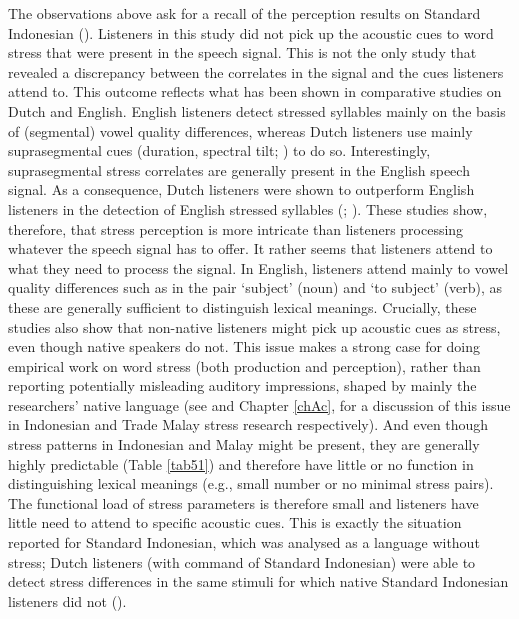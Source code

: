 The observations above ask for a recall of the perception results on Standard Indonesian (\citealt{vanzanten_word_1998}). Listeners in this study did not pick up the acoustic cues to word stress that were present in the speech signal. This is not the only study that revealed a discrepancy between the correlates in the signal and the cues listeners attend to. This outcome reflects what has been shown in comparative studies on Dutch and English. English listeners detect stressed syllables mainly on the basis of (segmental) vowel quality differences, whereas Dutch listeners use mainly suprasegmental cues (duration, spectral tilt; \citealt{sluijter_spectral_1997}) to do so. Interestingly, suprasegmental stress correlates are generally present in the English speech signal. As a consequence, Dutch listeners were shown to outperform English listeners in the detection of English stressed syllables (\citealt{cooper_constraints_2002}; \citealt{cutler_dutch_2007}). These studies show, therefore, that stress perception is more intricate than listeners processing whatever the speech signal has to offer. It rather seems that listeners attend to what they need to process the signal. In English, listeners attend mainly to vowel quality differences such as in the pair `subject' (noun) and `to subject' (verb), as these are generally sufficient to distinguish lexical meanings. Crucially, these studies also show that non-native listeners might pick up acoustic cues as stress, even though native speakers do not. This issue makes a strong case for doing empirical work on word stress (both production and perception), rather than reporting potentially misleading auditory impressions, shaped by mainly the researchers' native language (see \citealt{ode_perception_1994} and Chapter \ref{chAc}, for a discussion of this issue in Indonesian and Trade Malay stress research respectively). And even though stress patterns in Indonesian and Malay might be present, they are generally highly predictable (Table \ref{tab51}) and therefore have little or no function in distinguishing lexical meanings (e.g., small number or no minimal stress pairs). The functional load of stress parameters is therefore small and listeners have little need to attend to specific acoustic cues. This is exactly the situation reported for Standard Indonesian, which was analysed as a language without stress; Dutch listeners (with command of Standard Indonesian) were able to detect stress differences in the same stimuli for which native Standard Indonesian listeners did not (\citealt{vanzanten_word_1998}). \par

